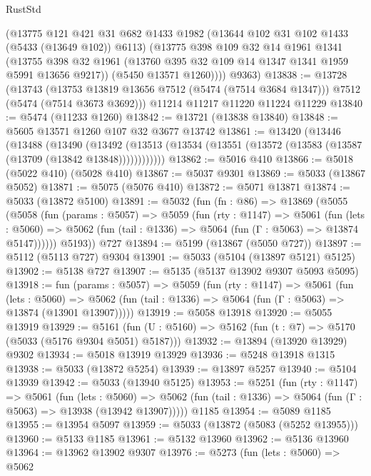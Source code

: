 \begin{lexlean}{RustStd}
\begin{coremodule}
        (@13775
          @121
          @421
          @31
          @682
          @1433
          @1982
          (@13644 @102 @31 @102 @1433 (@5433 (@13649 @102)) @6113)
          (@13775
            @398
            @109
            @32
            @14
            @1961
            @1341
            (@13755 @398 @32 @1961 (@13760 @395 @32 @109 @14 @1347 @1341 @1959 @5991 @13656 @9217))
            (@5450 @13571 @1260))))
      @9363)
@13838 := @13728
    (@13743
      (@13753 @13819 @13656 @7512 (@5474 (@7514 @3684 @1347)))
      @7512
      (@5474 (@7514 @3673 @3692)))
    @11214
    @11217
    @11220
    @11224
    @11229
@13840 := @5474 (@11233 @1260)
@13842 := @13721 (@13838 @13840)
@13848 := @5605 @13571 @1260 @107 @32 @3677 @13742
@13861 := @13420
    (@13446
      (@13488
        (@13490
          (@13492 (@13513 (@13534 (@13551 (@13572 (@13583 (@13587 (@13709 (@13842 @13848))))))))))))
@13862 := @5016 @410
@13866 := @5018 (@5022 @410) (@5028 @410)
@13867 := @5037 @9301
@13869 := @5033 (@13867 @5052)
@13871 := @5075 (@5076 @410)
@13872 := @5071 @13871
@13874 := @5033 (@13872 @5100)
@13891 := @5032
    (fun (fn : @86) =>
    @13869
      (@5055
        (@5058
          (fun (params : @5057) =>
          @5059
            (fun (rty : @1147) =>
            @5061
              (fun (lets : @5060) =>
              @5062 (fun (tail : @1336) => @5064 (fun (Γ : @5063) => @13874 @5147))))))
        @5193))
    @727
@13894 := @5199 (@13867 (@5050 @727))
@13897 := @5112 (@5113 @727) @9304
@13901 := @5033 (@5104 (@13897 @5121) @5125)
@13902 := @5138 @727
@13907 := @5135 (@5137 @13902 @9307 @5093 @5095)
@13918 := fun (params : @5057) =>
  @5059
    (fun (rty : @1147) =>
    @5061
      (fun (lets : @5060) =>
      @5062 (fun (tail : @1336) => @5064 (fun (Γ : @5063) => @13874 (@13901 @13907)))))
@13919 := @5058 @13918
@13920 := @5055 @13919
@13929 := @5161 (fun (U : @5160) => @5162 (fun (t : @7) => @5170 (@5033 (@5176 @9304 @5051) @5187)))
@13932 := @13894 (@13920 @13929) @9302
@13934 := @5018 @13919 @13929
@13936 := @5248 @13918 @1315
@13938 := @5033 (@13872 @5254)
@13939 := @13897 @5257
@13940 := @5104 @13939
@13942 := @5033 (@13940 @5125)
@13953 := @5251
    (fun (rty : @1147) =>
    @5061
      (fun (lets : @5060) =>
      @5062 (fun (tail : @1336) => @5064 (fun (Γ : @5063) => @13938 (@13942 @13907)))))
    @1185
@13954 := @5089 @1185
@13955 := @13954 @5097
@13959 := @5033 (@13872 (@5083 (@5252 @13955)))
@13960 := @5133 @1185
@13961 := @5132 @13960
@13962 := @5136 @13960
@13964 := @13962 @13902 @9307
@13976 := @5273
    (fun (lets : @5060) =>
    @5062

\end{coremodule}
\end{lexlean}
